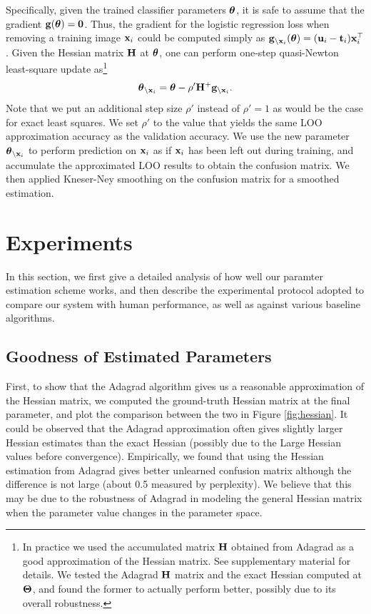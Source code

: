 Specifically, given the trained classifier parameters $\boldsymbol{\theta}$, it is safe to assume that the gradient $\mathbf{g}(\boldsymbol{\theta}) = \mathbf{0}$. Thus, the gradient for the logistic regression loss when removing a training image $\mathbf{x}_i$ could be computed simply as $\mathbf{g}_{\backslash\mathbf{x}_i}(\boldsymbol{\theta}) = (\mathbf{u}_i - \mathbf{t}_i) \mathbf{x}_i^\top$. Given the Hessian matrix $\mathbf{H}$ at $\boldsymbol{\theta}$, one can perform one-step quasi-Newton least-square update as\footnote{In practice we used the accumulated matrix $\mathbf{H}$ obtained from Adagrad \cite{duchi2010adaptive} as a good approximation of the Hessian matrix. See supplementary material for details. We tested the Adagrad $\mathbf{H}$ matrix and the exact Hessian computed at $\boldsymbol{\Theta}$, and found the former to actually perform better, possibly due to its overall robustness.}
\begin{equation}
    \boldsymbol{\theta}_{\backslash\mathbf{x}_i} = \boldsymbol{\theta} - \rho'\mathbf{H}^{+}\mathbf{g}_{\backslash\mathbf{x}_i}.
\end{equation}
Note that we put an additional step size $\rho'$ instead of $\rho'=1$ as would be the case for exact least squares. We set $\rho'$ to the value that yields the same LOO approximation accuracy as the validation accuracy. We use the new parameter $\boldsymbol{\theta}_{\backslash\mathbf{x}_i}$ to perform prediction on $\mathbf{x}_i$ as if $\mathbf{x}_i$ has been left out during training, and accumulate the approximated LOO results to obtain the confusion matrix. We then applied Kneser-Ney \cite{jurafsky2000speech} smoothing on the confusion matrix for a smoothed estimation.

\section{Experiments}
In this section, we first give a detailed analysis of how well our paramter estimation scheme works, and then describe the experimental protocol adopted to compare our system with human performance, as well as against various baseline algorithms.

\subsection{Goodness of Estimated Parameters}
First, to show that the Adagrad algorithm gives us a reasonable approximation of the Hessian matrix, we computed the ground-truth Hessian matrix at the final parameter, and plot the comparison between the two in Figure \ref{fig:hessian}. It could be observed that the Adagrad approximation often gives slightly larger Hessian estimates than the exact Hessian (possibly due to the Large Hessian values before convergence). Empirically, we found that using the Hessian estimation from Adagrad gives better unlearned confusion matrix although the difference is not large (about 0.5 measured by perplexity). We believe that this may be due to the robustness of Adagrad in modeling the general Hessian matrix when the parameter value changes in the parameter space.

